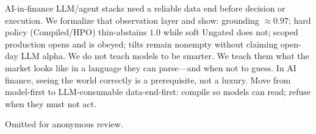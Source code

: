 \documentclass[sigconf,anonymous]{acmart}
\theoremstyle{acmdefinition}%
\theoremstyle{acmplain}%
\begin{document}
AI-in-finance LLM/agent stacks need a reliable data end before decision or execution.
We formalize that observation layer and show: grounding \({\approx}0.97\); hard policy (Compiled/HPO) thin-abstains \(1.0\) while soft Ungated does not; scoped production opens and is obeyed; tilts remain nonempty without claiming open-day LLM alpha.
We do not teach models to be smarter. We teach them what the market looks like in a language they can parse---and when not to guess.
In AI finance, seeing the world correctly is a prerequisite, not a luxury.
Move from model-first to LLM-consumable data-end-first: compile so models can read; refuse when they must not act.

\begin{acks}
Omitted for anonymous review.
\end{acks}



\end{document}
